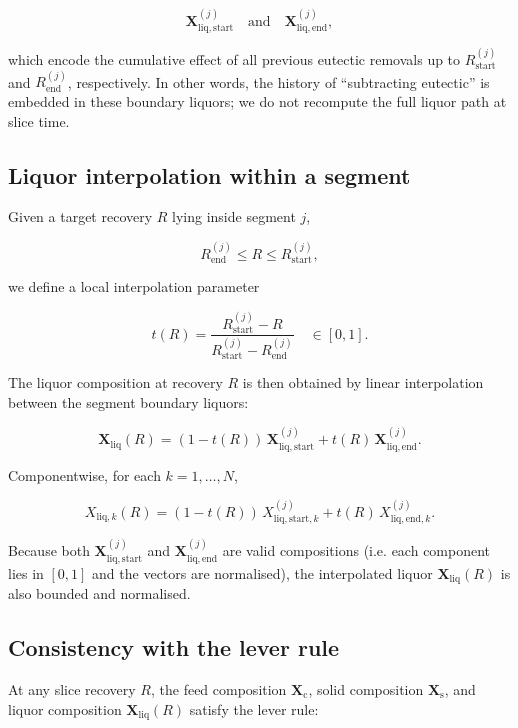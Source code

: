\[
\mathbf{X}^{(j)}_{\mathrm{liq,start}}
\quad \text{and} \quad
\mathbf{X}^{(j)}_{\mathrm{liq,end}},
\]


which encode the cumulative effect of all previous eutectic removals
up to \(R^{(j)}_{\mathrm{start}}\) and \(R^{(j)}_{\mathrm{end}}\),
respectively. In other words, the history of “subtracting eutectic”
is embedded in these boundary liquors; we do not recompute the full
liquor path at slice time.

\subsection*{Liquor interpolation within a segment}

Given a target recovery \(R\) lying inside segment \(j\),


\[
R^{(j)}_{\mathrm{end}} \le R \le R^{(j)}_{\mathrm{start}},
\]


we define a local interpolation parameter


\[
t(R) =
\frac{R^{(j)}_{\mathrm{start}} - R}
     {R^{(j)}_{\mathrm{start}} - R^{(j)}_{\mathrm{end}}}
\quad \in [0,1].
\]



The liquor composition at recovery \(R\) is then obtained by linear
interpolation between the segment boundary liquors:


\[
\mathbf{X}_{\mathrm{liq}}(R)
= (1 - t(R)) \, \mathbf{X}^{(j)}_{\mathrm{liq,start}}
  + t(R) \, \mathbf{X}^{(j)}_{\mathrm{liq,end}}.
\]



Componentwise, for each \(k = 1, \dots, N\),


\[
X_{\mathrm{liq},k}(R)
= (1 - t(R)) \, X^{(j)}_{\mathrm{liq,start},k}
  + t(R) \, X^{(j)}_{\mathrm{liq,end},k}.
\]



Because both \(\mathbf{X}^{(j)}_{\mathrm{liq,start}}\) and
\(\mathbf{X}^{(j)}_{\mathrm{liq,end}}\) are valid compositions
(i.e. each component lies in \([0,1]\) and the vectors are normalised),
the interpolated liquor \(\mathbf{X}_{\mathrm{liq}}(R)\) is also
bounded and normalised.

\subsection*{Consistency with the lever rule}

At any slice recovery \(R\), the feed composition \(\mathbf{X}_{\mathrm{c}}\),
solid composition \(\mathbf{X}_{\mathrm{s}}\), and liquor composition
\(\mathbf{X}_{\mathrm{liq}}(R)\) satisfy the lever rule:


